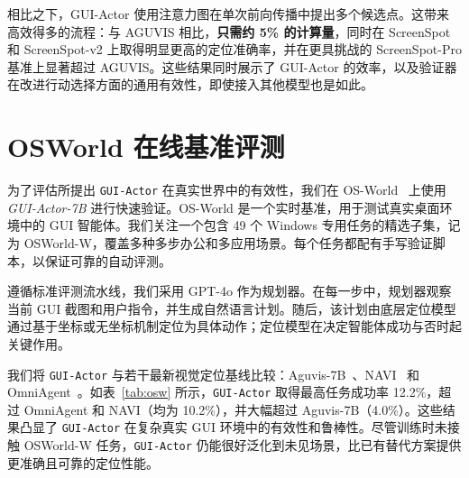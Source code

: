 \documentclass{article}
\newcommand{\sys}{\texttt{GUI-Actor}\xspace}
\begin{document}
相比之下，GUI-Actor 使用注意力图在单次前向传播中提出多个候选点。这带来高效得多的流程：与 AGUVIS 相比，\textbf{只需约 5\% 的计算量}，同时在 ScreenSpot 和 ScreenSpot-v2 上取得明显更高的定位准确率，并在更具挑战的 ScreenSpot-Pro 基准上显著超过 AGUVIS。这些结果同时展示了 GUI-Actor 的效率，以及验证器在改进行动选择方面的通用有效性，即使接入其他模型也是如此。

\section{OSWorld 在线基准评测}
\label{sec:online_eva}

为了评估所提出 \sys 在真实世界中的有效性，我们在 OS-World~\citep{xie2024osworld} 上使用 \textit{GUI-Actor-7B} 进行快速验证。OS-World 是一个实时基准，用于测试真实桌面环境中的 GUI 智能体。我们关注一个包含 49 个 Windows 专用任务的精选子集，记为 OSWorld-W，覆盖多种多步办公和多应用场景。每个任务都配有手写验证脚本，以保证可靠的自动评测。

遵循标准评测流水线，我们采用 GPT-4o 作为规划器。在每一步中，规划器观察当前 GUI 截图和用户指令，并生成自然语言计划。随后，该计划由底层定位模型通过基于坐标或无坐标机制定位为具体动作；定位模型在决定智能体成功与否时起关键作用。

我们将 \sys 与若干最新视觉定位基线比较：Aguvis-7B~\citep{xu2024aguvis}、NAVI~\cite{bonatti2024windows} 和 OmniAgent~\cite{lu2024omniparser}。如表~\ref{tab:osw} 所示，\sys 取得最高任务成功率 12.2\%，超过 OmniAgent 和 NAVI（均为 10.2\%），并大幅超过 Aguvis-7B（4.0\%）。这些结果凸显了 \sys 在复杂真实 GUI 环境中的有效性和鲁棒性。尽管训练时未接触 OSWorld-W 任务，\sys 仍能很好泛化到未见场景，比已有替代方案提供更准确且可靠的定位性能。

\begin{table}[h]
\centering
\caption{OSWorld-W 子集（49 个实时 Windows GUI 任务）上的任务成功率。\sys 在真实环境中显著超过已有定位模型。}
\label{tab:osw}
\end{table}
\end{document}
